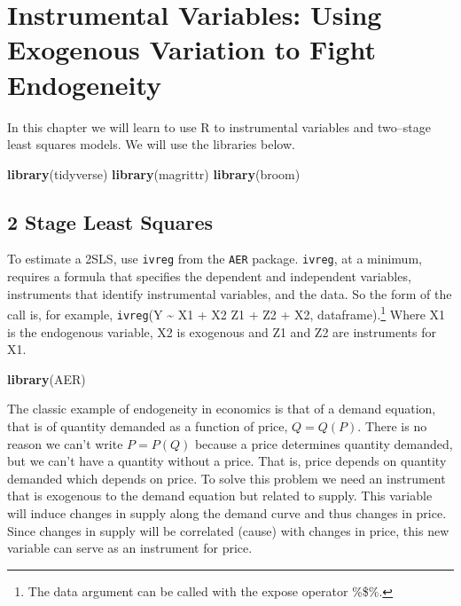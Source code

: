 \documentclass[]{book}
\newenvironment{Shaded}{\begin{snugshade}}{\end{snugshade}}
\newcommand{\KeywordTok}[1]{\textcolor[rgb]{0.13,0.29,0.53}{\textbf{#1}}}
\newcommand{\NormalTok}[1]{#1}
\let\rmarkdownfootnote\footnote%
\def\footnote{\protect\rmarkdownfootnote}
\begin{document}
\hypertarget{chp9}{%
\chapter{Instrumental Variables: Using Exogenous Variation to Fight Endogeneity}\label{chp9}}

In this chapter we will learn to use R to instrumental variables and two--stage least squares models. We will use the libraries below.

\begin{Shaded}
\begin{Highlighting}[]
\KeywordTok{library}\NormalTok{(tidyverse)}
\KeywordTok{library}\NormalTok{(magrittr)}
\KeywordTok{library}\NormalTok{(broom)}
\end{Highlighting}
\end{Shaded}

\hypertarget{stage-least-squares}{%
\section{2 Stage Least Squares}\label{stage-least-squares}}

To estimate a 2SLS, use \texttt{ivreg} from the \texttt{AER} package. \texttt{ivreg}, at a minimum, requires a formula that specifies the dependent and independent variables, instruments that identify instrumental variables, and the data. So the form of the call is, for example, \texttt{ivreg}(Y \textasciitilde{} X1 + X2 \textbar{} Z1 + Z2 + X2, dataframe).\footnote{The data argument can be called with the expose operator \%\$\%.} Where X1 is the endogenous variable, X2 is exogenous and Z1 and Z2 are instruments for X1.

\begin{Shaded}
\begin{Highlighting}[]
\KeywordTok{library}\NormalTok{(AER)}
\end{Highlighting}
\end{Shaded}

The classic example of endogeneity in economics is that of a demand equation, that is of quantity demanded as a function of price, \(Q=Q(P)\). There is no reason we can't write \(P=P(Q)\) because a price determines quantity demanded, but we can't have a quantity without a price. That is, price depends on quantity demanded which depends on price. To solve this problem we need an instrument that is exogenous to the demand equation but related to supply. This variable will induce changes in supply along the demand curve and thus changes in price. Since changes in supply will be correlated (cause) with changes in price, this new variable can serve as an instrument for price.
\end{document}
